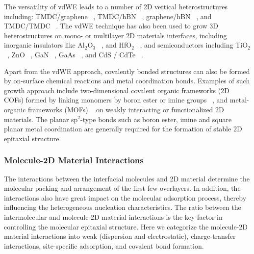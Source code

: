The versatility of vdWE leads to a number of 2D vertical
heterostructures including: TMDC/graphene
~\cite{Shi_2012_vdw_epi_MoS2_gr,Liu_2016_epi_MoS2_gr_rotation,Lin_2014_vdW_solid,Lin_2015_Wse2_MoS2_gr,Azizi_2015_Freevdw_Gr_TMDCs,Kim_2016_BiSnTe_gr},
TMDC/hBN
~\cite{Yan_2015_MoS2_on_hBN,Wang_2015_cvd_MoS2_BN,Cattelan_2015_Ws2_hBN},
graphene/hBN
~\cite{Liu_2011_gr_hBN,Zhang_2015_gr_hBN,Driver_2016_MBE_gr_hBN}, and
TMDC/TMDC
~\cite{Zhang_2014_vdw_epi_SnS2_MoS2,Diaz_2015_MoTe2_MoSe2,Gong_2014_WS2_MoS2,Alemayehu_2015_TMDC_vdw}.
%
The vdWE technique has also been used to grow 3D heterostructures on
mono- or multilayer 2D materials interfaces, including inorganic
insulators like Al\(_{\text{2}}\)O\(_{\text{3}}\)
~\cite{Zhang_2014_Al2O3_ALO_Gr,Vaziri_2013_ALD_Al2O3_gr}, and
HfO\(_{\text{2}}\) ~\cite{Alaboson_2011_PTCDA_gr_ALD},
%
and semiconductors including TiO\(_{\text{2}}\)
~\cite{Li_2015_TiO2_GO,Kumar_2011_gr_TiO2_generator,Zhang_2011_TiO2_gr},
ZnO ~\cite{Chung_2010_GaN_ZnO_gr,Oh_2014_ZnO_hBN}, GaN
~\cite{Kobayashi_2012_GaN_hBN,Kim_2014_direct_vdw_GaN_gr,Kim_2017_remote_epi_Gr},
GaAs
~\cite{Alaskar_2015_GaAs_gr_Si_theor,Kim_2017_remote_epi_Gr,Kong_2018_vdw_polar}, and CdS / CdTe
~\cite{Loeher_1994_vdw_epi_CdS_MoTe,Loeher_1996_CdTe_MoWTe}.

Apart from the vdWE approach, covalently bonded structures can also be
formed by on-surface chemical reactions and metal coordination
bonds. Examples of such growth approach include two-dimensional covalent organic frameworks (2D COFs) formed by linking monomers by boron ester
or imine groups
~\cite{Colson_2014_2D_COF_gr,Colson_2011_2DMOF_gr,Sun_2017_cof_gr}, and metal-organic frameworks (MOFs) ~\cite{Urgel_2015_MOF_BN,Kumar_2014_2D_MOF_gr} on weakly interacting or
functionalized 2D materials. The planar sp$^{2}$-type bonds
such as boron ester, imine and square planar metal coordination are
generally required for the formation of stable 2D epitaxial structure.

\subsubsection{Molecule-2D Material Interactions}
\label{sec:intro-mol-2D}

The interactions between the interfacial molecules and 2D material
determine the molecular packing and arrangement of the first few
overlayers. In addition, the interactions also have great impact on
the molecular adsorption process, thereby influencing the
heterogeneous nucleation characteristics. The
ratio between the intermolecular and molecule-2D material
interactions is the key factor in controlling the molecular epitaxial
structure. Here we categorize the molecule-2D material interactions
into weak (dispersion and electrostatic), charge-transfer
interactions, site-specific adsorption, and covalent bond formation.

